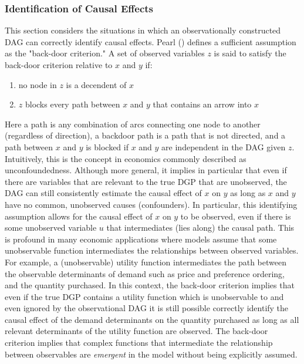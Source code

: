 \documentclass{article}
\begin{document}
\subsubsection{Identification of Causal Effects}

This section considers the situations in which an observationally constructed DAG can correctly identify causal effects. Pearl (\citeyear{pearl2009causality}) defines a sufficient assumption as the "back-door criterion." A set of observed variables $z$ is said to satisfy the back-door criterion relative to $x$ and $y$ if:

\begin{enumerate}
  \item no node in $z$ is a decendent of $x$ \label{bd1}
  \item $z$ blocks every path between $x$ and $y$ that contains an arrow into $x$ \label{bd2}
\end{enumerate}

Here a path is any combination of arcs connecting one node to another (regardless of direction), a backdoor path is a path that is not directed, and a path between $x$ and $y$ is blocked if $x$ and $y$ are independent in the DAG given $z$. Intuitively, this is the concept in economics commonly described as unconfoundedness. Although more general, it implies in particular that even if there are variables that are relevant to the true DGP that are unobserved, the DAG can still consistently estimate the causal effect of $x$ on $y$ as long as $x$ and $y$ have no common, unobserved causes (confounders). In particular, this identifying assumption allows for the causal effect of $x$ on $y$ to be observed, even if there is some unobserved variable $u$ that intermediates (lies along) the causal path. This is profound in many economic applications where models assume that some unobservable function intermediates the relationships between observed variables. For example, a (unobservable) utility function intermediates the path between the observable determinants of demand such as price and preference ordering, and the quantity purchased. In this context, the back-door criterion implies that even if the true DGP contains a utility function which is unobservable to and even ignored by the observational DAG it is still possible correctly identify the causal effect of the demand determinants on the quantity purchased as long as all relevant determinants of the utility function are observed. The back-door criterion implies that complex functions that intermediate the relationship between observables are \textit{emergent} in the model without being explicitly assumed.
\end{document}

